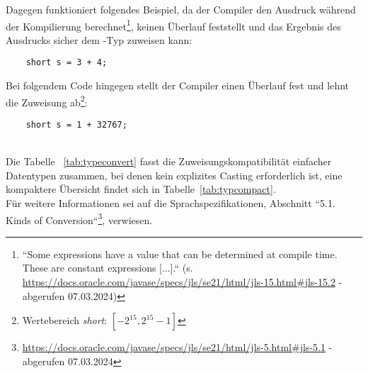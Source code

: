  \noindent
Dagegen funktioniert folgendes Beispiel, da der Compiler den Ausdruck während der Kompilierung berechnet\footnote{
    ``Some expressions have a value that can be determined at compile time. These are constant expressions [...].`` (s. \url{https://docs.oracle.com/javase/specs/jls/se21/html/jls-15.html#jls-15.2} - abgerufen 07.03.2024)
}, keinen Überlauf feststellt und das Ergebnis des Ausdrucks sicher dem -Typ zuweisen kann:

\begin{verbatim}
    short s = 3 + 4;
\end{verbatim}

Bei folgendem Code hingegen stellt der Compiler einen Überlauf fest und lehnt die Zuweisung ab\footnote{Wertebereich \textit{short}: $[-2^{15}, 2^{15} -1]$}:

\begin{verbatim}
    short s = 1 + 32767;
\end{verbatim}\\

\noindent
Die Tabelle ~\ref{tab:typeconvert} fasst die Zuweisungskompatibilität einfacher Datentypen zusammen, bei denen kein explizites Casting erforderlich ist, eine kompaktere Übersicht findet sich in Tabelle~\ref{tab:typcompact}.\\
Für weitere Informationen sei auf die Sprachspezifikationen, Abschnitt ``5.1. Kinds of Conversion``\footnote{
    \url{https://docs.oracle.com/javase/specs/jls/se21/html/jls-5.html#jls-5.1} - abgerufen 07.03.2024
}, verwiesen.


